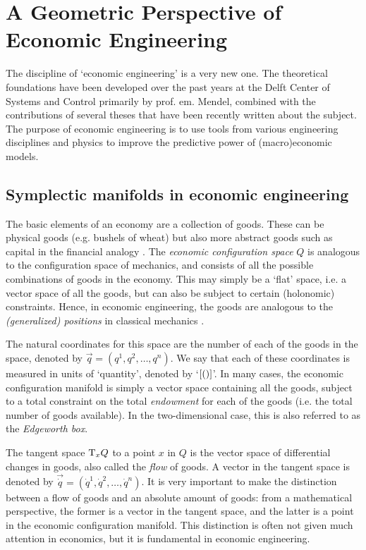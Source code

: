 \chapter{A Geometric Perspective of Economic Engineering}
\label{chap:symplectic_economics}

The discipline of `economic engineering' is a very new one. The theoretical foundations have been developed over the past years at the Delft Center of Systems and Control primarily by prof. em. Mendel, combined with the contributions of several theses that have been recently written about the subject. The purpose of economic engineering is to use tools from various engineering disciplines and physics to improve the predictive power of (macro)economic models.

\section{Symplectic manifolds in economic engineering}
The basic elements of an economy are a collection of goods. These can be physical goods (e.g. bushels of wheat) but also more abstract goods such as capital in the financial analogy \cite{Kruimer2021}. The \emph{economic configuration space} $Q$ is analogous to the configuration space of mechanics, and consists of all the possible combinations of goods in the economy. This may simply be a `flat' space, i.e. a vector space of all the goods, but can also be subject to certain (holonomic) constraints. Hence, in economic engineering, the goods are analogous to the \emph{(generalized) positions} in classical mechanics \cite{Mendel2019}. 

The natural coordinates for this space are the number of each of the goods in the space, denoted by $\vec{q} = (q^1, q^2, \ldots, q^n)$. We say that each of these coordinates is measured in units of `quantity', denoted by `$\qty[\si{\quantity}]$'. In many cases, the economic configuration manifold is simply a vector space containing all the goods, subject to a total constraint on the total \emph{endowment} for each of the goods (i.e. the total number of goods available). In the two-dimensional case, this is also referred to as the \emph{Edgeworth box}.

The tangent space $\mathrm{T}_{x} Q$ to a point $x$ in $Q$ is the vector space of differential changes in goods, also called the \emph{flow} of goods. A vector in the tangent space is denoted by $\vec{\dot{q}} = (\dot{q}^1, \dot{q}^2, \ldots, \dot{q}^n)$. It is very important to make the distinction between a flow of goods and an absolute amount of goods: from a mathematical perspective, the former is a vector in the tangent space, and the latter is a point in the economic configuration manifold. This distinction is often not given much attention in economics, but it is fundamental in economic engineering.

